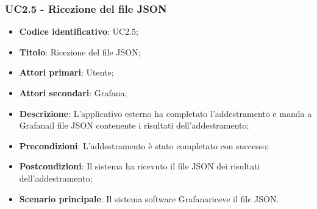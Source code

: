 \subsubsection{UC2.5 - Ricezione del file JSON}
\begin{itemize}
    \item \textbf{Codice identificativo}: UC2.5;
    \item \textbf{Titolo}: Ricezione del file JSON;
    \item \textbf{Attori primari}: Utente;
    \item \textbf{Attori secondari}: Grafana\glo ;
    \item \textbf{Descrizione}: L'applicativo esterno ha completato l'addestramento e manda a Grafana\glosp il file JSON contenente i risultati dell'addestramento;
    \item \textbf{Precondizioni}: L'addestramento è stato completato con successo;
    \item \textbf{Postcondizioni}: Il sistema ha ricevuto il file JSON dei risultati dell'addestramento;
    \item \textbf{Scenario principale}: Il sistema software Grafana\glo riceve il file JSON.
\end{itemize}